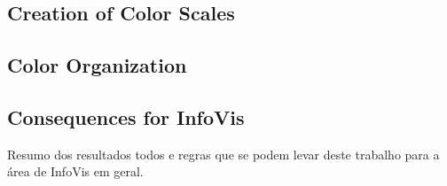 \subsection{Creation of Color Scales}
\label{subsec:results_discussion_colorscales}

\subsection{Color Organization}
\label{subsec:results_discussion_colororganization}

\subsection{Consequences for InfoVis}
\label{subsec:results_discussion_infovis}
%
Resumo dos resultados todos e regras que se podem levar deste trabalho para a área de InfoVis em geral.
%
